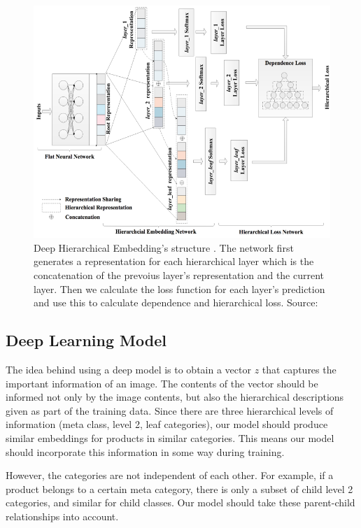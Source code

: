 \documentclass[conference]{IEEEtran}
\begin{document}
\begin{figure}[!t]
	\centering
	\includegraphics[scale=0.30]{network}
	\caption{Deep Hierarchical Embedding's structure . 
	The network first generates a representation for each hierarchical layer which is the concatenation
	of the prevoius layer's representation and the current layer. Then we calculate the loss
	function for each layer's prediction and use this to calculate dependence and hierarchical loss.
	Source:~\cite{gao2020deep}}
	\label{fig:network}
\end{figure}
\subsection{Deep Learning Model}
\label{sec:dlm}
The idea behind using a deep model is to obtain a vector $z$ that captures the important
information of an image.
The contents of the vector should be informed not only by the image contents, but also the 
hierarchical descriptions given as part of the training data.
Since there are three hierarchical levels of information (meta class, level 2, leaf categories),
our model should produce similar embeddings for products in similar categories.
This means our model should incorporate this information in some way during training.

However, the categories are not independent of each other.
For example, if a product belongs to a certain meta category, 
there is only a subset of child level 2 categories, and similar for 
child classes.
Our model should take these parent-child relationships into account.
\end{document}
